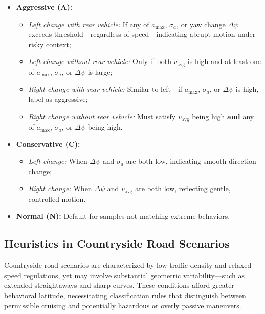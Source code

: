 \documentclass{article}
\begin{document}
\begin{itemize}[leftmargin=1em, topsep=0pt, itemsep=0.3em]
    \item \textbf{Aggressive (A):}
    \begin{itemize}
        \item \textit{Left change with rear vehicle:} If any of $a_{\max}$, $\sigma_a$, or yaw change $\Delta \psi$ exceeds threshold—regardless of speed—indicating abrupt motion under risky context;
        \item \textit{Left change without rear vehicle:} Only if both $v_{\text{avg}}$ is high and at least one of $a_{\max}$, $\sigma_a$, or $\Delta \psi$ is large;
        \item \textit{Right change with rear vehicle:} Similar to left—if $a_{\max}$, $\sigma_a$, or $\Delta \psi$ is high, label as aggressive;
        \item \textit{Right change without rear vehicle:} Must satisfy $v_{\text{avg}}$ being high \textbf{and} any of $a_{\max}$, $\sigma_a$, or $\Delta \psi$ being high.
    \end{itemize}
    
    \item \textbf{Conservative (C):}
    \begin{itemize}
        \item \textit{Left change:} When $\Delta \psi$ and $\sigma_a$ are both low, indicating smooth direction change;
        \item \textit{Right change:} When $\Delta \psi$ and $v_{\text{avg}}$ are both low, reflecting gentle, controlled motion.
    \end{itemize}

    \item \textbf{Normal (N):} Default for samples not matching extreme behaviors.
\end{itemize}



\subsection{Heuristics in Countryside Road Scenarios}

Countryside road scenarios are characterized by low traffic density and relaxed speed regulations, yet may involve substantial geometric variability—such as extended straightaways and sharp curves. These conditions afford greater behavioral latitude, necessitating classification rules that distinguish between permissible cruising and potentially hazardous or overly passive maneuvers.
\end{document}
